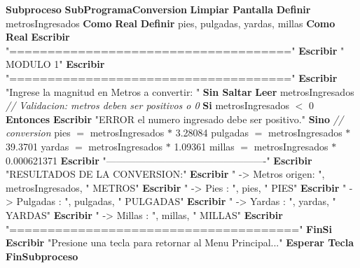 \documentclass[12pt,a4paper]{article}
\newcommand{\kw}[1]{\textcolor{pseKeyword}{\textbf{#1}}}
\newcommand{\txt}[1]{\textcolor{pseString}{"#1"}}
\newcommand{\num}[1]{\textcolor{pseNumber}{#1}}
\newcommand{\cmt}[1]{\textcolor{pseComment}{\textit{// #1}}}
\newcommand{\opAsig}{\textcolor{pseKeyword}{$=$}}
\newcommand{\opPor}{\textcolor{pseKeyword}{$*$}}
\newcommand{\opMenor}{\textcolor{pseKeyword}{$<$}}
\newcommand{\Asignacion}[2]{#1\; \opAsig\; #2}
\newcommand{\Escribir}[1]{\kw{Escribir} #1}
\newcommand{\EscribirSS}[1]{\kw{Escribir} #1 \kw{Sin Saltar}}
\newcommand{\Leer}[1]{\kw{Leer} #1}
\newcommand{\Definir}[2]{\kw{Definir} #1 \kw{Como} \kw{#2}}
\newcommand{\Si}[1]{\kw{Si} #1 \kw{Entonces}}
\newcommand{\Sino}{\kw{Sino}}
\newcommand{\FinSi}{\kw{FinSi}}
\newcommand{\Subproceso}[1]{\kw{Subproceso} \textbf{#1}}
\newcommand{\FinSubproceso}{\kw{FinSubproceso}}
\newcommand{\I}{\hspace{1.5em}}
\newcommand{\II}{\hspace{3.0em}}
\begin{document}
\begin{algorithmic}[1]
	
	\State \Subproceso{SubProgramaConversion}
	\State \I \kw{Limpiar Pantalla}
	\State \I \Definir{metrosIngresados}{Real}
	\State \I \Definir{pies, pulgadas, yardas, millas}{Real}
	\State
	\State \I \Escribir{\txt{=====================================}}
	\State \I \Escribir{\txt{                  MODULO 1}}
	\State \I \Escribir{\txt{=====================================}}
	\State \I \EscribirSS{\txt{Ingrese la magnitud en Metros a convertir: }}
	\State \I \Leer{metrosIngresados}
	\State
	\State \I \cmt{Validacion: metros deben ser positivos o 0}
	\State \I \Si{metrosIngresados \opMenor{} \num{0}}
	\State \II \Escribir{\txt{ERROR el numero ingresado debe ser positivo.}}
	\State \I \Sino
	\State \II \cmt{conversion}
	\State \II \Asignacion{pies}{metrosIngresados \opPor{} \num{3.28084}}
	\State \II \Asignacion{pulgadas}{metrosIngresados \opPor{} \num{39.3701}}
	\State \II \Asignacion{yardas}{metrosIngresados \opPor{} \num{1.09361}}
	\State \II \Asignacion{millas}{metrosIngresados \opPor{} \num{0.000621371}}
	\State
	\State \II \Escribir{\txt{-------------------------------------------------}}
	\State \II \Escribir{\txt{RESULTADOS DE LA CONVERSION:}}
	\State \II \Escribir{\txt{  -> Metros origen: }, metrosIngresados, \txt{ METROS}}
	\State \II \Escribir{\txt{  -> Pies         : }, pies, \txt{ PIES}}
	\State \II \Escribir{\txt{  -> Pulgadas     : }, pulgadas, \txt{ PULGADAS}}
	\State \II \Escribir{\txt{  -> Yardas       : }, yardas, \txt{ YARDAS}}
	\State \II \Escribir{\txt{  -> Millas       : }, millas, \txt{ MILLAS}}
	\State \II \Escribir{\txt{======================================}}
	\State \I \FinSi
	\State \I \Escribir{\txt{Presione una tecla para retornar al Menu Principal...}}
	\State \I \kw{Esperar Tecla}
	\State \FinSubproceso
	

\end{algorithmic}
\end{document}
